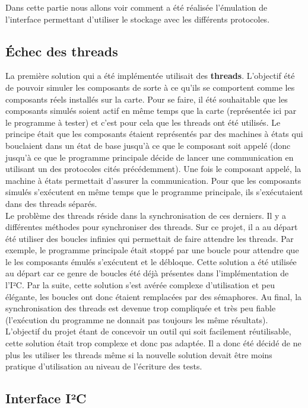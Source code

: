 \documentclass[a4paper]{article}
\begin{document}
Dans cette partie nous allons voir comment a été réalisée l'émulation de
l'interface permettant d'utiliser le stockage avec les différents protocoles.

\subsection{Échec des threads}

La première solution qui a été implémentée utilisait des \textbf{threads}.
L'objectif été de pouvoir simuler les composants de sorte à ce qu'ils se
comportent comme les composants réels installés sur la carte. Pour se faire, il
été souhaitable que les composants simulés soient actif en même temps que la
carte (représentée ici par le programme à tester) et c'est pour cela que les
threads ont été utilisés. Le principe était que les composants étaient
représentés par des machines à états qui bouclaient dans un état de base jusqu'à
ce que le composant soit appelé (donc jusqu'à ce que le programme principale
décide de lancer une communication en utilisant un des protocoles cités
précédemment). Une fois le composant appelé, la machine à états permettait
d'assurer la communication. Pour que les composants simulés s'exécutent en même
temps que le programme principale, ils s'exécutaient dans des threads séparés.
\\

Le problème des threads réside dans la synchronisation de ces derniers. Il y a
différentes méthodes pour synchroniser des threads. Sur ce projet, il a au
départ été utiliser des boucles infinies qui permettait de faire attendre les
threads. Par exemple, le programme principale était stoppé par une boucle pour
attendre que le les composants émulés s'exécutent et le débloque. Cette solution
a été utilisée au départ car ce genre de boucles été déjà présentes dans
l'implémentation de l'I²C. Par la suite, cette solution s'est avérée complexe
d'utilisation et peu élégante, les boucles ont donc étaient remplacées par des %
sémaphores. Au final, la synchronisation des threads est devenue trop compliquée
et très peu fiable (l'exécution du programme ne donnait pas toujours les même
résultats). L'objectif du projet étant de concevoir un outil qui soit facilement
réutilisable, cette solution était trop complexe et donc pas adaptée. Il a donc
été décidé de ne plus les utiliser les threads même si la nouvelle solution
devait être moins pratique d'utilisation au niveau de l'écriture des tests.

\subsection{Interface I²C}
\end{document}
